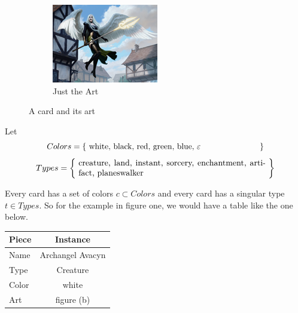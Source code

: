 \begin{figure}[h!]
\begin{subfigure}[b]{0.6\linewidth}
        \includegraphics[width=\linewidth]{figures/ArchangelAvacynCut.png}
        \caption{Just the Art}
    \end{subfigure}
    \caption{A card and its art}
    \label{fig:intro_card}
\end{figure}

\noindent
Let
\[ Colors=\left\{\ \parbox[c]{.6\linewidth}{%
white, black, red, green, blue, $\varepsilon$
}\ \right\}
\]
\[ Types=\left\{\ \parbox[c]{.65\linewidth}{%
creature, land, instant, sorcery, enchantment, artifact, planeswalker
}\ \right\}
\]

Every card has a set of colors $c \subset Colors$ 
and every card has a singular type $t \in Types$.
So for the example in figure one, we would have a table
like the one below.
\indent

\begin{table}[h!]
    \begin{center}
        \label{tab:intro_card_table}
        \begin{tabular}{l|c}
            \textbf{Piece} & \textbf{Instance} \\
            \hline
            Name & Archangel Avacyn \\
            Type & Creature \\
            Color & white \\
            Art & figure (b)
        \end{tabular}
    \end{center}
\end{table}

